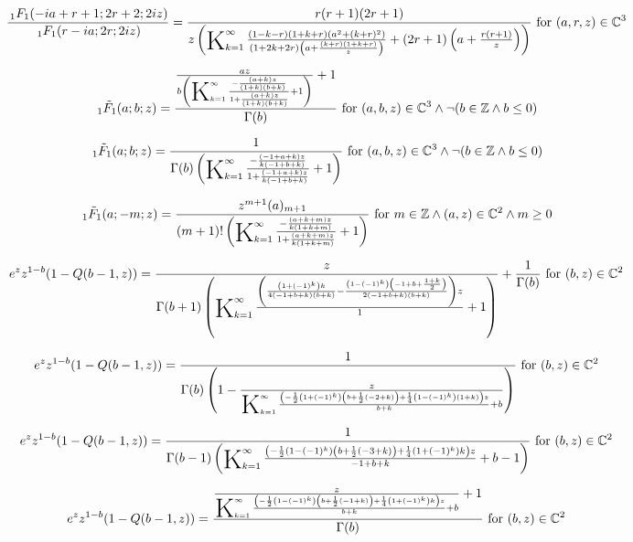 \documentclass{article}
\newcommand{\bigK}{\mathop{\raisebox{-5pt}{\huge K}}}
\begin{document}
\[\frac{\, _1F_1(-i a+r+1;2 r+2;2 i z)}{\, _1F_1(r-i a;2 r;2 i z)}=\frac{r (r+1) (2 r+1)}{z \left(\bigK_{k=1}^{\infty}\frac{(1-k-r) (1+k+r) \left(a^2+(k+r)^2\right)}{(1+2 k+2 r) \left(a+\frac{(k+r) (1+k+r)}{z}\right)}+(2 r+1) \left(a+\frac{r (r+1)}{z}\right)\right)}\text{ for }(a,r,z)\in \mathbb{C}^3\] 

\[\, _1\tilde{F}_1(a;b;z)=\frac{\frac{a z}{b \left(\bigK_{k=1}^{\infty}\frac{-\frac{(a+k) z}{(1+k) (b+k)}}{1+\frac{(a+k) z}{(1+k) (b+k)}}+1\right)}+1}{\Gamma (b)}\text{ for }(a,b,z)\in \mathbb{C}^3\land \neg (b\in \mathbb{Z}\land b\leq 0)\] 

\[\, _1\tilde{F}_1(a;b;z)=\frac{1}{\Gamma (b) \left(\bigK_{k=1}^{\infty}\frac{-\frac{(-1+a+k) z}{k (-1+b+k)}}{1+\frac{(-1+a+k) z}{k (-1+b+k)}}+1\right)}\text{ for }(a,b,z)\in \mathbb{C}^3\land \neg (b\in \mathbb{Z}\land b\leq 0)\] 

\[\, _1\tilde{F}_1(a;-m;z)=\frac{z^{m+1} (a)_{m+1}}{(m+1)! \left(\bigK_{k=1}^{\infty}\frac{-\frac{(a+k+m) z}{k (1+k+m)}}{1+\frac{(a+k+m) z}{k (1+k+m)}}+1\right)}\text{ for }m\in \mathbb{Z}\land (a,z)\in \mathbb{C}^2\land m\geq 0\] 

\[e^z z^{1-b} (1-Q(b-1,z))=\frac{z}{\Gamma (b+1) \left(\bigK_{k=1}^{\infty}\frac{\left(\frac{\left(1+(-1)^k\right) k}{4 (-1+b+k) (b+k)}-\frac{\left(1-(-1)^k\right) \left(-1+b+\frac{1+k}{2}\right)}{2 (-1+b+k) (b+k)}\right) z}{1}+1\right)}+\frac{1}{\Gamma (b)}\text{ for }(b,z)\in \mathbb{C}^2\] 

\[e^z z^{1-b} (1-Q(b-1,z))=\frac{1}{\Gamma (b) \left(1-\frac{z}{\bigK_{k=1}^{\infty}\frac{\left(-\frac{1}{2} \left(1+(-1)^k\right) \left(b+\frac{1}{2} (-2+k)\right)+\frac{1}{4} \left(1-(-1)^k\right) (1+k)\right) z}{b+k}+b}\right)}\text{ for }(b,z)\in \mathbb{C}^2\] 

\[e^z z^{1-b} (1-Q(b-1,z))=\frac{1}{\Gamma (b-1) \left(\bigK_{k=1}^{\infty}\frac{\left(-\frac{1}{2} \left(1-(-1)^k\right) \left(b+\frac{1}{2} (-3+k)\right)+\frac{1}{4} \left(1+(-1)^k\right) k\right) z}{-1+b+k}+b-1\right)}\text{ for }(b,z)\in \mathbb{C}^2\] 

\[e^z z^{1-b} (1-Q(b-1,z))=\frac{\frac{z}{\bigK_{k=1}^{\infty}\frac{\left(-\frac{1}{2} \left(1-(-1)^k\right) \left(b+\frac{1}{2} (-1+k)\right)+\frac{1}{4} \left(1+(-1)^k\right) k\right) z}{b+k}+b}+1}{\Gamma (b)}\text{ for }(b,z)\in \mathbb{C}^2\] 
\end{document}
